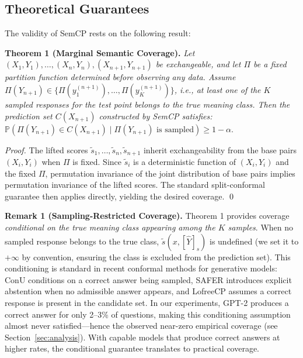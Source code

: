 \documentclass{article}
\begin{document}
\subsection{Theoretical Guarantees}

\label{sec:theoretical_guarantees}

The validity of SemCP rests on the following result:

\textbf{Theorem 1 (Marginal Semantic Coverage).} \textit{Let $(X_1, Y_1), \ldots, (X_n, Y_n), (X_{n+1}, Y_{n+1})$ be exchangeable, and let $\Pi$ be a fixed partition function determined before observing any data. Assume $\Pi(Y_{n+1}) \in \{\Pi(y_1^{(n+1)}), \ldots, \Pi(y_K^{(n+1)})\}$, i.e., at least one of the $K$ sampled responses for the test point belongs to the true meaning class. Then the prediction set $C(X_{n+1})$ constructed by SemCP satisfies:} $\mathbb{P}\!\left(\Pi(Y_{n+1}) \in C(X_{n+1}) \mid \Pi(Y_{n+1}) \text{ is sampled}\right) \geq 1 - \alpha$.

\textit{Proof.} The lifted scores $\tilde{s}_1, \ldots, \tilde{s}_n, \tilde{s}_{n+1}$ inherit exchangeability from the base pairs $(X_i, Y_i)$ when $\Pi$ is fixed. Since $\tilde{s}_i$ is a deterministic function of $(X_i, Y_i)$ and the fixed $\Pi$, permutation invariance of the joint distribution of base pairs implies permutation invariance of the lifted scores. The standard split-conformal guarantee \cite{angelopoulos2024theoretical} then applies directly, yielding the desired coverage. \qed

\textbf{Remark 1 (Sampling-Restricted Coverage).} Theorem 1 provides coverage \emph{conditional on the true meaning class appearing among the $K$ samples}. When no sampled response belongs to the true class, $\tilde{s}(x, [\hat{Y}]_s)$ is undefined (we set it to $+\infty$ by convention, ensuring the class is excluded from the prediction set). This conditioning is standard in recent conformal methods for generative models: ConU \cite{wang2024conu} conditions on a correct answer being sampled, SAFER \cite{kumar2025safer} introduces explicit abstention when no admissible answer appears, and LofreeCP \cite{su2024lofreecp} assumes a correct response is present in the candidate set. In our experiments, GPT-2 produces a correct answer for only 2--3\% of questions, making this conditioning assumption almost never satisfied---hence the observed near-zero empirical coverage (see Section~\ref{sec:analysis}). With capable models that produce correct answers at higher rates, the conditional guarantee translates to practical coverage.
\end{document}
